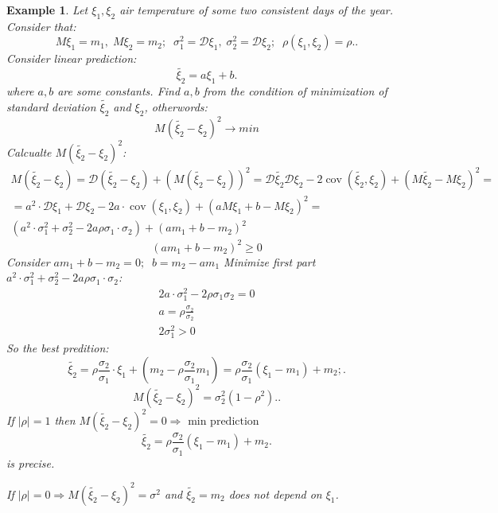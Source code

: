 \documentclass[12pt,letterpaper]{report}
\newtheorem*{example}{Example}
\DeclareMathOperator{\cov}{cov}
\begin{document}
\begin{example}
    Let $\xi_1, \xi_2$ air temperature of some two consistent days of the year. Consider that:
    \[
    M\xi_1 = m_1, \; M\xi_2 = m_2 ; \;\;
    \sigma_1^2 = \mathcal{D}\xi_1, \; \sigma_2^2 = \mathcal{D}\xi_2; \;\;
    \rho(\xi_1, \xi_2) = \rho.
    .\] 
    Consider linear prediction:
    \[
        \widetilde{\xi_2} = a\xi_1 + b
    .\] 
    where $a, b$ are some constants.
    Find $a, b$ from the condition of minimization of standard deviation $\widetilde{\xi_2}$ and $\xi_2$, otherwords:
    \[ M(\widetilde{\xi_2} - \xi_2)^2 \rightarrow min \]
    Calcualte $M(\widetilde{\xi_2} - \xi_2)^2$:
            \begin{gather*}
                M(\widetilde{\xi_2} - \xi_2) = \mathcal{D}(\widetilde{\xi_2} - \xi_2) + (M(\widetilde{\xi_2} - \xi_2))^2 = \mathcal{D}\widetilde{\xi_2} \mathcal{D}\xi_2 - 2\cov(\widetilde{\xi_2}, \xi_2) + (M \widetilde{\xi_2} - M\xi_2)^2 =\\
                = a^2 \cdot \mathcal{D}\xi_1 + \mathcal{D}\xi_2 - 2a\cdot \cov(\xi_1, \xi_2)
                    + (aM\xi_1 + b-M\xi_2)^2 = \\
                ( a^2\cdot \sigma_1^2 + \sigma_2^2 - 2a \rho \sigma_1 \cdot \sigma_2 ) + 
                    (am_1 + b - m_2) ^2
            \end{gather*}
            \[ (am_1 + b -m_2)^2 \geq 0 \]
            Consider $am_1 + b - m_2 = 0; \;\; b = m_2 - am_1$
            Minimize first part $a^2\cdot \sigma_1^2 + \sigma_2^2 - 2a \rho \sigma_1 \cdot \sigma_2$:
            \begin{gather*}
                2a\cdot \sigma_1^2 - 2\rho\sigma_1\sigma_2 = 0 \\
                a = \rho \frac{\sigma_2}{\sigma_2} \\
                2\sigma_1^2 > 0 
            \end{gather*}
            So the best predition:
            \[
                \widetilde{\xi_2} = \rho \frac{\sigma_2}{\sigma_1}\cdot \xi_1 + (m_2 - \rho\frac{\sigma_2}{\sigma_1} m_1) = \rho\frac{\sigma_2}{\sigma_1}(\xi_1 - m_1) + m_2;
            .\] 
            \[
                M(\widetilde{\xi_2} - \xi_2)^2 = \sigma_2^2(1-\rho^2).
            .\] 
            If $|\rho| = 1$ then $M(\widetilde{\xi_2} - \xi_2)^2 = 0 \Rightarrow \text{ min prediction}$
            \[
                \widetilde{\xi_2} = \rho\frac{\sigma_2}{\sigma_1} (\xi_1 - m_1) + m_2
            .\] is precise.

            If $|\rho| = 0 \Rightarrow M(\widetilde{\xi_2} - \xi_2)^2 = \sigma^2$ and $\widetilde{\xi_2} = m_2$ does not depend on $\xi_1$.
\end{example}
\end{document}
